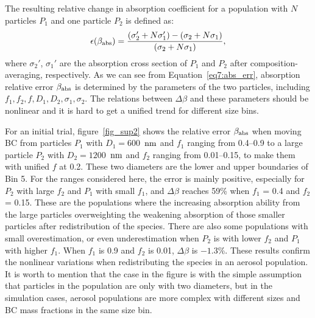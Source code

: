 \documentclass[edeposit,fullpage]{uiucthesis2009}
\makeatletter
\DeclareRobustCommand*\unit[1]
 {\ensuremath{%
   {\thinmuskip3mu\relax
    \def\mu{\text{\textmu}}\def~{\,}%
    \ifx\f@series\testbx\mathbf{#1}\else\mathrm{#1}\fi}}}
\makeatother
\begin{document}
The resulting relative change in absorption coefficient for a
population with $N$ particles $P_1$ and one particle $P_2$ is defined
as:
  \begin{equation}{\label{eq7:abs_err}}
   \epsilon(\beta_{\rm abs}) = \frac{(\sigma_2' + N\sigma_1') - (\sigma_2 + N\sigma_1)}{(\sigma_2 + N\sigma_1)},
  \end{equation}
  where $\sigma_2'$, $\sigma_1'$ are the absorption cross section of
  $P_1$ and $P_2$ after composition-averaging, respectively.  As we
  can see from Equation~\ref{eq7:abs_err}, absorption relative error
  $\beta_{\rm abs}$ is determined by the parameters of the two
  particles, including $f_1, f_2, f, D_1, D_2,\sigma_1, \sigma_2$. The
  relations between $\Delta \beta$ and these parameters should be
  nonlinear and it is hard to get a unified trend for different size
  bins.
  
  For an initial trial, figure~\ref{fig_sup2} shows the relative
  error $\beta_{\rm abs}$ when moving BC from particles $P_1$ with
  $D_1 = 600$~\unit{nm} and $f_1$ ranging from 0.4--0.9 to a large
  particle $P_2$ with $D_2 = 1200$~\unit{nm} and $f_2$ ranging from
  0.01--0.15, to make them with unified $f$ at 0.2.  These two
  diameters are the lower and upper boundaries of Bin 5. For the
  ranges considered here, the error is mainly positive, especially for
  $P_2$ with large $f_2$ and $P_1$ with small $f_1$, and $\Delta
  \beta$ reaches 59\% when $f_1$ = 0.4 and $f_2$ = 0.15. These are the
  populations where the increasing absorption ability from the large
  particles overweighting the weakening absorption of those smaller
  particles after redistribution of the species. There are also some
  populations with small overestimation, or even underestimation when
  $P_2$ is with lower $f_2$ and $P_1$ with higher $f_1$. When $f_1$ is
  0.9 and $f_2$ is 0.01, $\Delta \beta$ is $-1.3$\%. These results
  confirm the nonlinear variations when redistributing the species in
  an aerosol population. It is worth to mention that the case in the
  figure is with the simple assumption that particles in the
  population are only with two diameters, but in the simulation cases,
  aerosol populations are more complex with different sizes and BC
  mass fractions in the same size bin.
  
\end{document}
